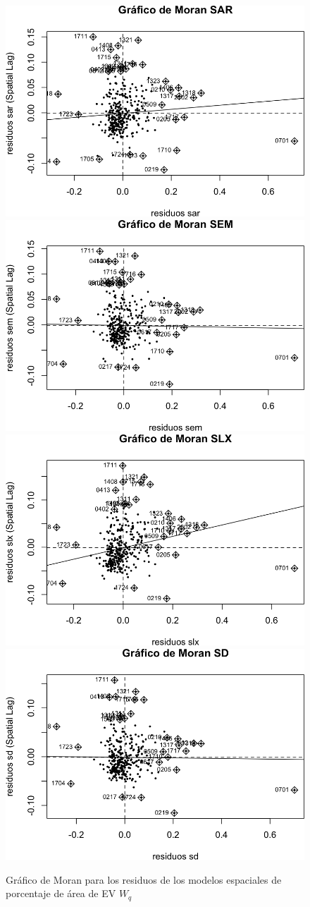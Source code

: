 \documentclass[12pt,]{book}
\begin{document}
\begin{figure}
\includegraphics[width=0.49\linewidth]{tesis-unigis_files/figure-latex/moranplot-resmodel-areaep-all-wq-1} \includegraphics[width=0.49\linewidth]{tesis-unigis_files/figure-latex/moranplot-resmodel-areaep-all-wq-2} \includegraphics[width=0.49\linewidth]{tesis-unigis_files/figure-latex/moranplot-resmodel-areaep-all-wq-3} \includegraphics[width=0.49\linewidth]{tesis-unigis_files/figure-latex/moranplot-resmodel-areaep-all-wq-4} \caption{Gráfico de Moran para los residuos de los modelos espaciales de porcentaje de área de EV $W_{q}$}\label{fig:moranplot-resmodel-areaep-all-wq}
\end{figure}
\end{document}
